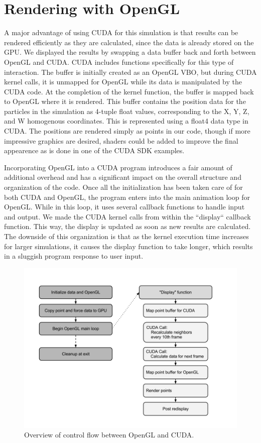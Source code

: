 \documentclass[cameraready]{acmsiggraph-awb}
\begin{document}
\section{Rendering with OpenGL}

A major advantage of using CUDA for this simulation is that results can be rendered efficiently as they are calculated, since the data is already stored on the GPU.
We displayed the results by swapping a data buffer back and forth between OpenGL and CUDA.  
CUDA includes functions specifically for this type of interaction.  
The buffer is initially created as an OpenGL VBO, but during CUDA kernel calls, it is unmapped for OpenGL while its data is manipulated by the CUDA code.
At the completion of the kernel function, the buffer is mapped back to OpenGL where it is rendered.
This buffer contains the position data for the particles in the simulation as 4-tuple float values, corresponding to the X, Y, Z, and W homogenous coordinates.
This is represented using a float4 data type in CUDA.
The positions are rendered simply as points in our code, though if more impressive graphics are desired, shaders could be added to improve the final appearence as is done in one of the CUDA SDK examples.

Incorporating OpenGL into a CUDA program introduces a fair amount of additional overhead and has a significant impact on the overall structure and organization of the code.
Once all the initialization has been taken care of for both CUDA and OpenGL, the program enters into the main animation loop for OpenGL.  
While in this loop, it uses several callback functions to handle input and output.
We made the CUDA kernel calls from within the ``display`` callback function.
This way, the display is updated as soon as new results are calculated.  
The downside of this organization is that as the kernel execution time increases for larger simulations, it causes the display function to take longer, which results in a sluggish program response to user input.


\begin{figure}
\begin{centering}
\includegraphics[width = 5in]{Figures/openglFlowchart.png}
\caption{Overview of control flow between OpenGL and CUDA.}
\label{fig:kernelDivision}
\end{centering}
\end{figure}
\end{document}
